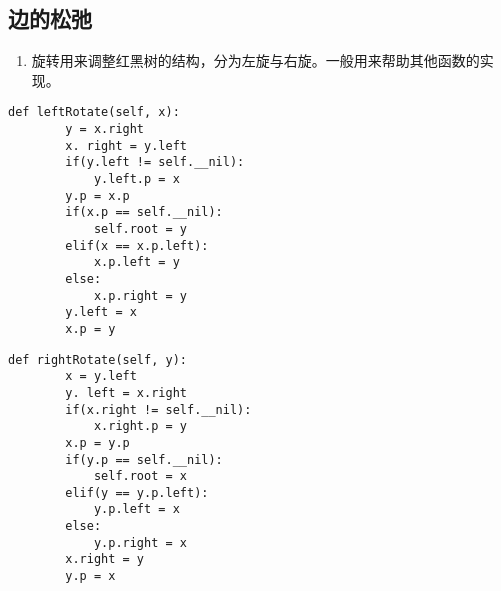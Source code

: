 \documentclass[12pt,letterpaper]{article}
\begin{document}
\subsection{边的松弛}
\begin{enumerate}
	\item 旋转用来调整红黑树的结构，分为左旋与右旋。一般用来帮助其他函数的实现。
\end{enumerate}
\begin{lstlisting}[style = Python]
    def leftRotate(self, x):
        y = x.right
        x. right = y.left
        if(y.left != self.__nil):
            y.left.p = x
        y.p = x.p
        if(x.p == self.__nil):
            self.root = y
        elif(x == x.p.left):
            x.p.left = y
        else:
            x.p.right = y
        y.left = x
        x.p = y
\end{lstlisting}
\begin{lstlisting}[style = Python]
    def rightRotate(self, y):
        x = y.left
        y. left = x.right
        if(x.right != self.__nil):
            x.right.p = y
        x.p = y.p
        if(y.p == self.__nil):
            self.root = x
        elif(y == y.p.left):
            y.p.left = x
        else:
            y.p.right = x
        x.right = y
        y.p = x
\end{lstlisting}
\end{document}
